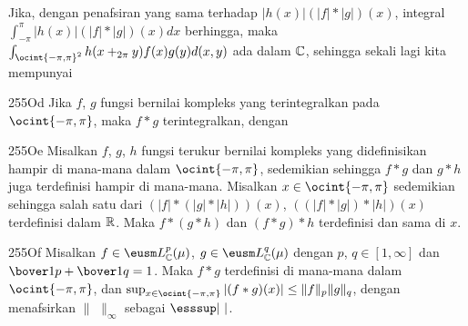  Jika, dengan penafsiran yang sama terhadap $|h(x)|(|f|*|g|)(x)$,
integral $\int_{-\pi}^{\pi}|h(x)|(|f|*|g|)(x)dx$
berhingga, maka $\int_{\ocint{-\pi,\pi}^2}h(x+_{2\pi}y)f(x)g(y)d(x,y)$ ada dalam
$\Bbb C$, sehingga sekali lagi kita mempunyai


\spheader 255Od Jika $f$, $g$ fungsi bernilai kompleks
yang terintegralkan pada $\ocint{-\pi,\pi}$, maka $f*g$
terintegralkan, dengan


\spheader 255Oe Misalkan $f$, $g$, $h$ fungsi terukur bernilai kompleks
yang didefinisikan hampir di mana-mana dalam $\ocint{-\pi,\pi}$, sedemikian sehingga $f*g$
dan $g*h$ juga terdefinisi hampir di mana-mana.   Misalkan
$x\in\ocint{-\pi,\pi}$ sedemikian sehingga salah satu dari $(|f|*(|g|*|h|))(x)$,
$((|f|*|g|)*|h|)(x)$ terdefinisi dalam $\Bbb R$.   Maka $f*(g*h)$ dan
$(f*g)*h$ terdefinisi dan sama di $x$.

\spheader 255Of Misalkan $f\in\eusm L^p_{\Bbb C}(\mu)$,
$g\in\eusm L^{q}_{\Bbb C}(\mu)$ dengan $p$, $q\in[1,\infty]$ dan
$\bover1p+\bover1{q}=1$.   Maka $f*g$ terdefinisi
di mana-mana dalam $\ocint{-\pi,\pi}$, dan
$\sup_{x\in\ocint{-\pi,\pi}}|(f*g)(x)|\le\|f\|_p\|g\|_q$, dengan menafsirkan
$\|\,\,\|_{\infty}$ sebagai $\esssup |\,\,|$.

